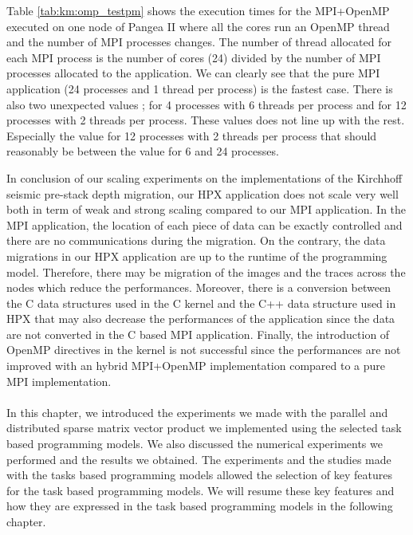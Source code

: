 Table \ref{tab:km:omp_testpm} shows the execution times for the MPI+OpenMP executed on one node of Pangea II where all the cores run an OpenMP thread and the number of MPI processes changes.
The number of thread allocated for each MPI process is the number of cores (24) divided by the number of MPI processes allocated to the application.
We can clearly see that the pure MPI application (24 processes and 1 thread per process) is the fastest case.
There is also two unexpected values ; for 4 processes with 6 threads per process and for 12 processes with 2 threads per process.
These values does not line up with the rest.
Especially the value for 12 processes with 2 threads per process that should reasonably be between the value for 6 and 24 processes.

In conclusion of our scaling experiments on the implementations of the Kirchhoff seismic pre-stack depth migration, our HPX application does not scale very well both in term of weak and strong scaling compared to our MPI application.
In the MPI application, the location of each piece of data can be exactly controlled and there are no communications during the migration.
On the contrary, the data migrations in our HPX application are up to the runtime of the programming model.
Therefore, there may be migration of the images and the traces across the nodes which reduce the performances.
Moreover, there is a conversion between the C data structures used in the C kernel and the C++ data structure used in HPX that may also decrease the performances of the application since the data are not converted in the C based MPI application.
Finally, the introduction of OpenMP directives in the kernel is not successful since the performances are not improved with an hybrid MPI+OpenMP implementation compared to a pure MPI implementation.

\paragraph{}
In this chapter, we introduced the experiments we made with the parallel and distributed sparse matrix vector product we implemented using the selected task based programming models.
We also discussed the numerical experiments we performed and the results we obtained.
The experiments and the studies made with the tasks based programming models allowed the selection of key features for the task based programming models.
We will resume these key features and how they are expressed in the task based programming models in the following chapter.